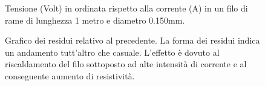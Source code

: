 \documentclass[italian,a4paper]{article}
\begin{document}
\begin{figure}[p]\caption{Tensione (Volt) in ordinata rispetto alla corrente (A) in un filo di rame di lunghezza 1 metro e diametro 0.150mm.}
\centering

\end{figure}
\begin{figure}[p]\caption{Grafico dei residui relativo al precedente. La forma dei residui indica un andamento tutt'altro che casuale. L'effetto è dovuto al riscaldamento del filo sottoposto ad alte intensità di corrente e al conseguente aumento di resistività.}
\centering

\end{figure}
\end{document}
